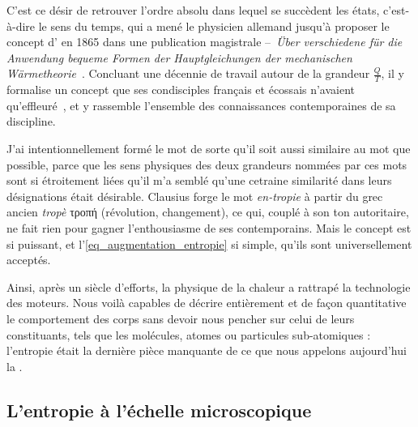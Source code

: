 		C’est ce désir de retrouver l’ordre absolu dans lequel se succèdent les états, c’est-à-dire le sens du temps, qui a mené le physicien allemand  jusqu’à proposer le concept d’ en 1865 dans une publication magistrale --\ \textit{Über verschiedene für die Anwendung bequeme Formen der Hauptgleichungen der mechanischen Wärmetheorie}~\cite{clausius1865,clausius1867en,clausius1868fr2}. Concluant une décennie de travail autour de la grandeur $\frac{Q}{T}$, il y formalise un concept que ses condisciples français  et écossais  n’avaient qu’effleuré~\cite{truesdell1980}, et y rassemble l’ensemble des connaissances contemporaines de sa discipline.
		
			J’ai intentionnellement formé le mot  de sorte qu’il soit aussi similaire au mot  que possible, parce que les sens physiques des deux grandeurs nommées par ces mots sont si étroitement liées qu’il m’a semblé qu’une cetraine similarité dans leurs désignations était désirable.
		Clausius forge le mot \textit{en-tropie} à partir du grec ancien \textit{tropè} \textgreek{τροπή} (révolution, changement), ce qui, couplé à son ton autoritaire, ne fait rien pour gagner l’enthousiasme de ses contemporains. Mais le concept est si puissant, et l’\cref{eq_augmentation_entropie} si simple, qu’ils sont universellement acceptés.
		
		Ainsi, après un siècle d’efforts, la physique de la chaleur a rattrapé la technologie des moteurs. Nous voilà capables de décrire entièrement et de façon quantitative le comportement des corps sans devoir nous pencher sur celui de leurs constituants, tels que les molécules, atomes ou particules sub-atomiques : l’entropie était la dernière pièce manquante de ce que nous appelons aujourd’hui la .
		
		
	\subsection{L’entropie à l’échelle microscopique}
	\label{ch_entropie_boltzmann}
	
